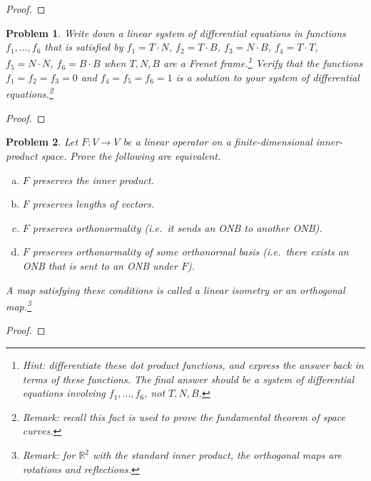 \documentclass[11pt]{article}
\newtheorem{problem}{Problem}
\begin{document}
\begin{proof}

\end{proof}



\pagebreak



\begin{problem}
Write down a linear system of differential equations in functions $f_1,\ldots,f_6$ that is  satisfied by $f_1=T\cdot N$, $f_2=T\cdot B$, $f_3=N\cdot B$, $f_4=T\cdot T$, $f_5=N\cdot N$, $f_6=B\cdot B$ when $T,N,B$ are a Frenet frame.\footnote{Hint: differentiate these dot product functions, and express the answer back in terms of these functions. The final answer should be a system of differential equations involving $f_1,\ldots,f_6$, not $T,N,B$.} Verify that the functions $f_1=f_2=f_3=0$ and $f_4=f_5=f_6=1$ is a solution to your system of differential equations.\footnote{Remark: recall this fact is used to prove the fundamental theorem of space curves.} 
\end{problem}

\begin{proof}

\end{proof}

\pagebreak

\begin{problem}
Let $F:V\to V$ be a linear operator on a finite-dimensional inner-product space. Prove the following are equivalent. 
\begin{enumerate} [(a)]
\item $F$ preserves the inner product. 
\item $F$ preserves lengths of vectors. 
\item $F$ preserves orthonormality (i.e.\ it sends an ONB to another ONB). 
\item $F$ preserves orthonormality of some orthonormal basis (i.e.\ there exists an ONB that is sent to an ONB under $F$).
\end{enumerate} 
A map satisfying these conditions is called a linear isometry or an orthogonal map.\footnote{Remark: for $\mathbb R^2$ with the standard inner product, the orthogonal maps are rotations and reflections.} 
\end{problem}

\begin{proof}

\end{proof}
\end{document}
